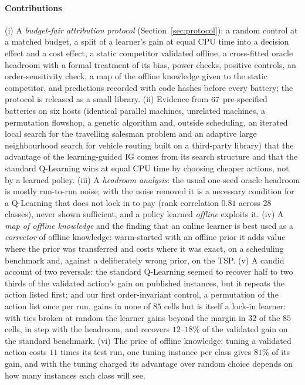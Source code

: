 \paragraph{Contributions} (i) A \emph{budget-fair attribution protocol} (Section~\ref{sec:protocol}): a random control at a matched budget, a split of a learner's gain at equal CPU time into a decision effect and a cost effect, a static competitor validated offline, a cross-fitted oracle headroom with a formal treatment of its bias, power checks, positive controls, an order-sensitivity check, a map of the offline knowledge given to the static competitor, and predictions recorded with code hashes before every battery; the protocol is released as a small library. (ii) Evidence from $67$ pre-specified batteries on six hosts (identical parallel machines, unrelated machines, a permutation flowshop, a genetic algorithm and, outside scheduling, an iterated local search for the travelling salesman problem and an adaptive large neighbourhood search for vehicle routing built on a third-party library) that the advantage of the learning-guided IG comes from its search structure and that the standard Q-Learning wins at equal CPU time by choosing cheaper actions, not by a learned policy. (iii) A \emph{headroom analysis}: the usual one-seed oracle headroom is mostly run-to-run noise; with the noise removed it is a necessary condition for a Q-Learning that does not lock in to pay (rank correlation $0.81$ across $28$ classes), never shown sufficient, and a policy learned \emph{offline} exploits it. (iv) A \emph{map of offline knowledge} and the finding that an online learner is best used as a \emph{corrector} of offline knowledge: warm-started with an offline prior it adds value where the prior was transferred and costs where it was exact, on a scheduling benchmark and, against a deliberately wrong prior, on the TSP. (v) A candid account of two reversals: the standard Q-Learning seemed to recover half to two thirds of the validated action's gain on published instances, but it repeats the action listed first; and our first order-invariant control, a permutation of the action list once per run, gains in none of $85$ cells but is itself a lock-in learner: with ties broken at random the learner gains beyond the margin in $32$ of the $85$ cells, in step with the headroom, and recovers $12$--$18\%$ of the validated gain on the standard benchmark. (vi) The price of offline knowledge: tuning a validated action costs $11$ times its test run, one tuning instance per class gives $81\%$ of its gain, and with the tuning charged its advantage over random choice depends on how many instances each class will see.

